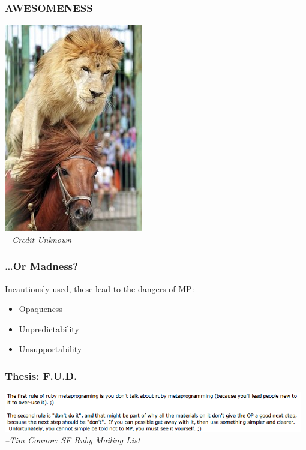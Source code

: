 \documentclass[slidestop,compress,mathserif]{beamer}
\begin{document}
\begin{frame}
		\frametitle{AWESOMENESS}
		\begin{center}
			\includegraphics[scale=0.45]{img/lion_horse.jpg} \\
			\emph{-- Credit Unknown}
		\end{center}
\end{frame}

\begin{frame}
	\frametitle{{\ldots}Or Madness?}
	Incautiously used, these lead to the dangers of MP:
	\begin{itemize}
		\item Opaqueness
		\item Unpredictability
		\item Unsupportability
	\end{itemize}
\end{frame}

\begin{frame}
	\frametitle{Thesis:  F.U.D.}
		\includegraphics[width=0.98\textwidth, height=0.25\textheight]{img/tim_hates_mp.png}
		\vskip 0.5cm
		\emph{--Tim Connor:  SF Ruby Mailing List}
\end{frame}
\end{document}
